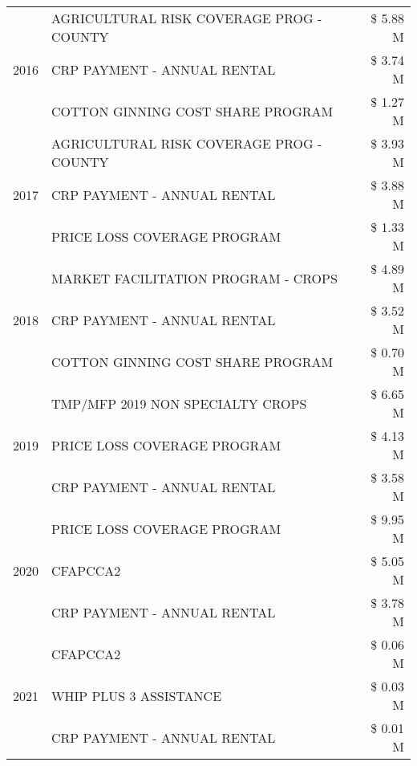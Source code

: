 \begin{tabular}{llr}
\cline{1-3}
\multirow[t]{3}{*}{2016} & AGRICULTURAL RISK COVERAGE PROG - COUNTY & \$ 5.88 M \\
 & CRP PAYMENT - ANNUAL RENTAL & \$ 3.74 M \\
 & COTTON GINNING COST SHARE PROGRAM & \$ 1.27 M \\
\cline{1-3}
\multirow[t]{3}{*}{2017} & AGRICULTURAL RISK COVERAGE PROG - COUNTY & \$ 3.93 M \\
 & CRP PAYMENT - ANNUAL RENTAL & \$ 3.88 M \\
 & PRICE LOSS COVERAGE PROGRAM & \$ 1.33 M \\
\cline{1-3}
\multirow[t]{3}{*}{2018} & MARKET FACILITATION PROGRAM - CROPS & \$ 4.89 M \\
 & CRP PAYMENT - ANNUAL RENTAL & \$ 3.52 M \\
 & COTTON GINNING COST SHARE PROGRAM & \$ 0.70 M \\
\cline{1-3}
\multirow[t]{3}{*}{2019} & TMP/MFP 2019 NON SPECIALTY CROPS & \$ 6.65 M \\
 & PRICE LOSS COVERAGE PROGRAM & \$ 4.13 M \\
 & CRP PAYMENT - ANNUAL RENTAL & \$ 3.58 M \\
\cline{1-3}
\multirow[t]{3}{*}{2020} & PRICE LOSS COVERAGE PROGRAM & \$ 9.95 M \\
 & CFAPCCA2 & \$ 5.05 M \\
 & CRP PAYMENT - ANNUAL RENTAL & \$ 3.78 M \\
\cline{1-3}
\multirow[t]{3}{*}{2021} & CFAPCCA2 & \$ 0.06 M \\
 & WHIP PLUS 3 ASSISTANCE & \$ 0.03 M \\
 & CRP PAYMENT - ANNUAL RENTAL & \$ 0.01 M \\
\cline{1-3}
\bottomrule
\end{tabular}
